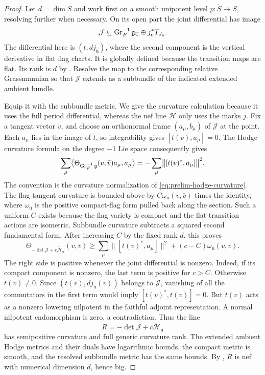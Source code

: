 \begin{proof}
Let $d=\dim S$ and work first on a smooth unipotent level
$p:\widetilde S\to S$, resolving further when necessary.
On its open part the joint differential has image
\[
 \mathcal J\subseteq
 \operatorname{Gr}_F^{-1}\mathfrak g_{\mathbb C}\oplus
 j_{\mathrm u}^*T_{J_{\mathrm u}}.
\]
The differential here is $(t,dj_{\mathrm u})$, where the
second component is the vertical derivative in flat flag
charts.  It is globally defined because the transition maps
are flat.  Its rank is $d$ by .
Resolve the map to the corresponding relative Grassmannian
so that $\mathcal J$ extends as a subbundle of the indicated
extended ambient bundle.

Equip it with the subbundle metric.  We give the curvature
calculation because it uses the full period differential,
whereas the nef line $\mathcal H$ only uses the marks $j$.
Fix a tangent vector $v$, and choose an orthonormal frame
$(a_\mu,b_\mu)$ of $\mathcal J$ at the point.  Each
$a_\mu$ lies in the image of $t$, so integrability gives
$[t(v),a_\mu]=0$.  The Hodge curvature formula on the
degree $-1$ Lie space consequently gives
\[
 \sum_\mu
 \bigl\langle\Theta_{\operatorname{Gr}_F^{-1}\mathfrak g}(v,\bar v)
          a_\mu,a_\mu\bigr\rangle
 =-\sum_\mu\bigl\|[t(v)^*,a_\mu]\bigr\|^2.
\]
The convention is the curvature normalization of
\eqref{eq:prelim-hodge-curvature}.  The flag tangent curvature is
bounded above by $C\omega_{\mathrm u}(v,\bar v)$ times
the identity, where $\omega_{\mathrm u}$ is the positive
compact-flag form pulled back along the section.  Such a
uniform $C$ exists because the flag variety is compact and
the flat transition actions are isometric.  Subbundle
curvature subtracts a squared second fundamental form.
After increasing $C$ by the fixed rank $d$, this proves
\begin{equation}\label{eq:marked-curvature-estimate}
 \Theta_{-\det\mathcal J+c\widetilde{\mathcal H}_{\mathrm u}}
       (v,\bar v)
 \geq \sum_\mu\bigl\|[t(v)^*,a_\mu]\bigr\|^2
          +(c-C)\omega_{\mathrm u}(v,\bar v).
\end{equation}
The right side is positive whenever the joint differential
is nonzero.  Indeed, if its compact component is nonzero,
the last term is positive for $c>C$.  Otherwise
$t(v)\ne0$.  Since $(t(v),dj_{\mathrm u}(v))$ belongs
to $\mathcal J$, vanishing of all the commutators in
the first term would imply $[t(v)^*,t(v)]=0$.
But $t(v)$ acts as a nonzero lowering nilpotent in the
faithful adjoint representation.  A normal nilpotent
endomorphism is zero, a contradiction.  Thus the line
\[
 R=-\det\mathcal J+c\widetilde{\mathcal H}_{\mathrm u}
\]
has semipositive curvature and full generic curvature rank.
The extended ambient Hodge metrics and their duals have
logarithmic bounds, the compact metric is smooth, and the
resolved subbundle metric has the same bounds.  By
, $R$ is nef with numerical dimension
$d$, hence big.


\end{proof}
